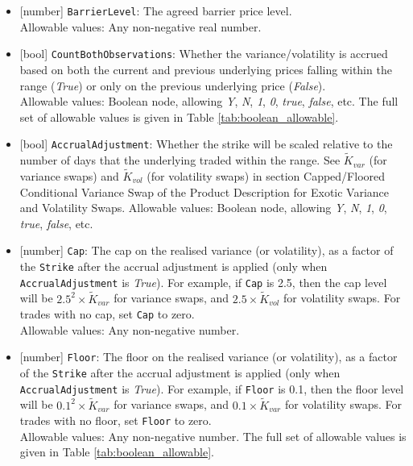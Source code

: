 \begin{itemize}
  Allowable values: \emph{DownIn, UpIn, DownOut, UpOut}.
  \item{}[number] \lstinline!BarrierLevel!: The agreed barrier price level. \\
  Allowable values: Any non-negative real number.
  \item{}[bool] \lstinline!CountBothObservations!: Whether the variance/volatility is accrued based on both the current and
  previous underlying prices falling within the range (\emph{True}) or only on the previous underlying price
  (\emph{False}). \\
  Allowable values: Boolean node, allowing \emph{Y}, \emph{N}, \emph{1}, \emph{0}, \emph{true}, \emph{false}, etc.
  The full set of allowable values is given in Table \ref{tab:boolean_allowable}.
  \item{}[bool] \lstinline!AccrualAdjustment!: Whether the strike will be scaled relative to the number of days that the
  underlying traded within the range. See $\widetilde{K}_{var}$ (for variance swaps) and $\widetilde{K}_{vol}$
  (for volatility swaps) in section Capped/Floored Conditional Variance Swap of the Product Description for
  Exotic Variance and Volatility Swaps.
  Allowable values: Boolean node, allowing \emph{Y}, \emph{N}, \emph{1}, \emph{0}, \emph{true}, \emph{false}, etc.
  \item{}[number] \lstinline!Cap!: The cap on the realised variance (or volatility), as a factor of the \lstinline!Strike! after
  the accrual adjustment is applied (only when \lstinline!AccrualAdjustment! is \emph{True}). For example,
  if \lstinline!Cap! is 2.5, then the cap level will be $2.5^2 \times \widetilde{K}_{var}$ for variance swaps, and
  $2.5 \times \widetilde{K}_{vol}$ for volatility swaps. For trades with no cap, set \lstinline!Cap! to zero. \\
  Allowable values: Any non-negative number.
  \item{}[number] \lstinline!Floor!: The floor on the realised variance (or volatility), as a factor of the \lstinline!Strike! after
  the accrual adjustment is applied (only when \lstinline!AccrualAdjustment! is \emph{True}). For example,
  if \lstinline!Floor! is 0.1, then the floor level will be $0.1^2 \times \widetilde{K}_{var}$ for variance swaps, and
  $0.1 \times \widetilde{K}_{var}$ for volatility swaps. For trades with no floor, set
  \lstinline!Floor! to zero. \\
  Allowable values: Any non-negative number.
  The full set of allowable values is given in Table \ref{tab:boolean_allowable}.

\end{itemize}
